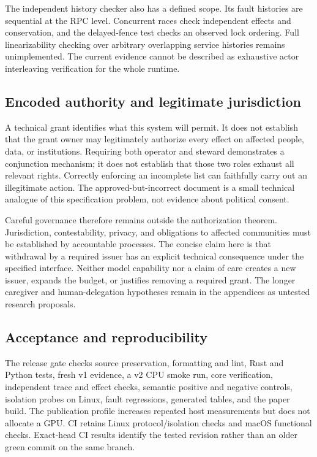 The independent history checker also has a defined scope. Its fault histories
are sequential at the RPC level. Concurrent races check independent effects and
conservation, and the delayed-fence test checks an observed lock ordering. Full
linearizability checking over arbitrary overlapping service histories remains
unimplemented. The current evidence cannot be described as exhaustive actor
interleaving verification for the whole runtime.

\subsection{Encoded authority and legitimate jurisdiction}
A technical grant identifies what this system will permit. It does not establish
that the grant owner may legitimately authorize every effect on affected people,
data, or institutions. Requiring both operator and steward demonstrates a
conjunction mechanism; it does not establish that those two roles exhaust all
relevant rights. Correctly enforcing an incomplete list can faithfully carry out
an illegitimate action. The approved-but-incorrect document is a small technical
analogue of this specification problem, not evidence about political consent.

Careful governance therefore remains outside the authorization theorem.
Jurisdiction, contestability, privacy, and obligations to affected communities
must be established by accountable processes. The concise claim here is that
withdrawal by a required issuer has an explicit technical consequence under the
specified interface. Neither model capability nor a claim of care creates a new
issuer, expands the budget, or justifies removing a required grant. The longer
caregiver and human-delegation hypotheses remain in the appendices as untested
research proposals.

\subsection{Acceptance and reproducibility}
The release gate checks source preservation, formatting and lint, Rust and
Python tests, fresh v1 evidence, a v2 CPU smoke run, core verification, independent
trace and effect checks, semantic positive and negative controls, isolation
probes on Linux, fault regressions, generated tables, and the paper build. The
publication profile increases repeated host measurements but does not allocate
a GPU. CI retains Linux protocol/isolation checks and macOS functional checks.
Exact-head CI results identify the tested revision rather than an older green
commit on the same branch.

